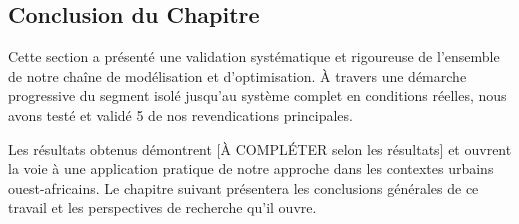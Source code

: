 \subsection{Conclusion du Chapitre}
\label{sec:conclusion_validation}

Cette section a présenté une validation systématique et rigoureuse de l'ensemble de notre chaîne de modélisation et d'optimisation. À travers une démarche progressive du segment isolé jusqu'au système complet en conditions réelles, nous avons testé et validé 5 de nos revendications principales.


Les résultats obtenus démontrent [À COMPLÉTER selon les résultats] et ouvrent la voie à une application pratique de notre approche dans les contextes urbains ouest-africains. Le chapitre suivant présentera les conclusions générales de ce travail et les perspectives de recherche qu'il ouvre.
